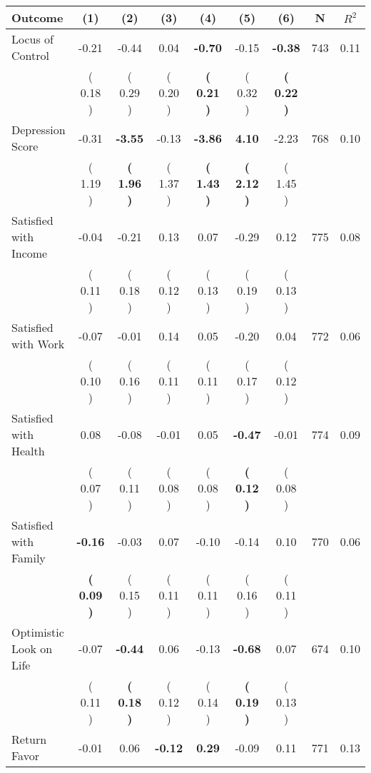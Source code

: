 \begin{tabular}{lcccccccc}
\toprule
 \textbf{Outcome} & \textbf{(1)} & \textbf{(2)} & \textbf{(3)} & \textbf{(4)} & \textbf{(5)} & \textbf{(6)} & \textbf{N} & \textbf{$ R^2$} \\
\midrule
Locus of Control &     -0.21 &     -0.44 &      0.04 & \textbf{    -0.70} &     -0.15 & \textbf{    -0.38} & 743 &       0.11 \\ 
 & (     0.18 ) & (     0.29 ) & (     0.20 ) & \textbf{(     0.21 )} & (     0.32 ) & \textbf{(     0.22 )} & \\
Depression Score &     -0.31 & \textbf{    -3.55} &     -0.13 & \textbf{    -3.86} & \textbf{     4.10} &     -2.23 & 768 &       0.10 \\ 
 & (     1.19 ) & \textbf{(     1.96 )} & (     1.37 ) & \textbf{(     1.43 )} & \textbf{(     2.12 )} & (     1.45 ) & \\
Satisfied with Income &     -0.04 &     -0.21 &      0.13 &      0.07 &     -0.29 &      0.12 & 775 &       0.08 \\ 
 & (     0.11 ) & (     0.18 ) & (     0.12 ) & (     0.13 ) & (     0.19 ) & (     0.13 ) & \\
Satisfied with Work &     -0.07 &     -0.01 &      0.14 &      0.05 &     -0.20 &      0.04 & 772 &       0.06 \\ 
 & (     0.10 ) & (     0.16 ) & (     0.11 ) & (     0.11 ) & (     0.17 ) & (     0.12 ) & \\
Satisfied with Health &      0.08 &     -0.08 &     -0.01 &      0.05 & \textbf{    -0.47} &     -0.01 & 774 &       0.09 \\ 
 & (     0.07 ) & (     0.11 ) & (     0.08 ) & (     0.08 ) & \textbf{(     0.12 )} & (     0.08 ) & \\
Satisfied with Family & \textbf{    -0.16} &     -0.03 &      0.07 &     -0.10 &     -0.14 &      0.10 & 770 &       0.06 \\ 
 & \textbf{(     0.09 )} & (     0.15 ) & (     0.11 ) & (     0.11 ) & (     0.16 ) & (     0.11 ) & \\
Optimistic Look on Life &     -0.07 & \textbf{    -0.44} &      0.06 &     -0.13 & \textbf{    -0.68} &      0.07 & 674 &       0.10 \\ 
 & (     0.11 ) & \textbf{(     0.18 )} & (     0.12 ) & (     0.14 ) & \textbf{(     0.19 )} & (     0.13 ) & \\
Return Favor &     -0.01 &      0.06 & \textbf{    -0.12} & \textbf{     0.29} &     -0.09 &      0.11 & 771 &       0.13 \\ 

\end{tabular}

